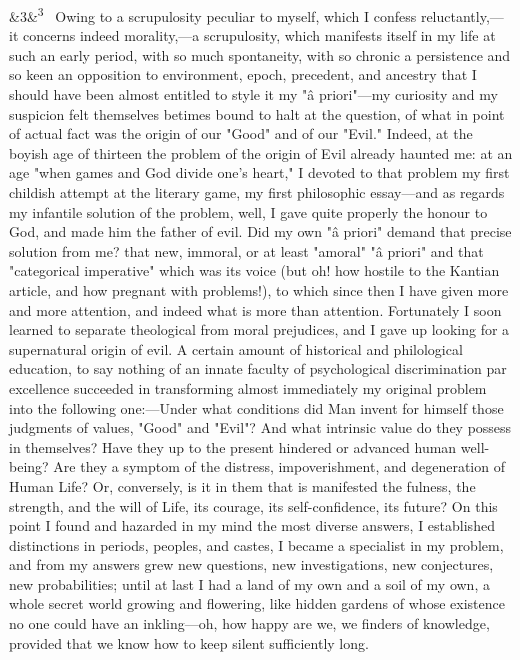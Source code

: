 \documentclass[12pt]{article}
\newcommand{\para}[1][]{\par\noindent\ifx&#1&\else\textsuperscript{\footnotesize #1}~\fi}
\begin{document}
\para[3] Owing to a scrupulosity peculiar to myself, which I confess reluctantly,---it concerns indeed morality,---a scrupulosity, which manifests itself in my life at such an early period, with so much spontaneity, with so chronic a persistence and so keen an opposition to environment, epoch, precedent, and ancestry that I should have been almost entitled to style it my "â priori"---my curiosity and my suspicion felt themselves betimes bound to halt at the question, of what in point of actual fact was the origin of our "Good" and of our "Evil." Indeed, at the boyish age of thirteen the problem of the origin of Evil already haunted me: at an age "when games and God divide one's heart," I devoted to that problem my first childish attempt at the literary game, my first philosophic essay---and as regards my infantile solution of the problem, well, I gave quite properly the honour to God, and made him the father of evil. Did my own "â priori" demand that precise solution from me? that new, immoral, or at least "amoral" "â priori" and that "categorical imperative" which was its voice (but oh! how hostile to the Kantian article, and how pregnant with problems!), to which since then I have given more and more attention, and indeed what is more than attention. Fortunately I soon learned to separate theological from moral prejudices, and I gave up looking for a supernatural origin of evil. A certain amount of historical and philological education, to say nothing of an innate faculty of psychological discrimination par excellence succeeded in transforming almost immediately my original problem into the following one:---Under what conditions did Man invent for himself those judgments of values, "Good" and "Evil"? And what intrinsic value do they possess in themselves? Have they up to the present hindered or advanced human well-being? Are they a symptom of the distress, impoverishment, and degeneration of Human Life? Or, conversely, is it in them that is manifested the fulness, the strength, and the will of Life, its courage, its self-confidence, its future? On this point I found and hazarded in my mind the most diverse answers, I established distinctions in periods, peoples, and castes, I became a specialist in my problem, and from my answers grew new questions, new investigations, new conjectures, new probabilities; until at last I had a land of my own and a soil of my own, a whole secret world growing and flowering, like hidden gardens of whose existence no one could have an inkling---oh, how happy are we, we finders of knowledge, provided that we know how to keep silent sufficiently long.
\end{document}
